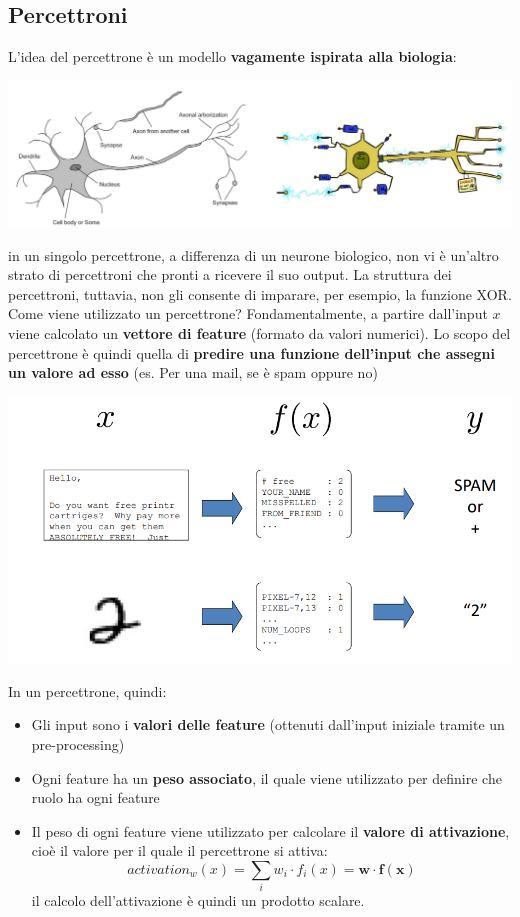 \documentclass[12pt]{article}
\begin{document}
\subsection{Percettroni}
L'idea del percettrone è un modello \textbf{vagamente ispirata alla biologia}:
\begin{center}
    \includegraphics[width =0.80\linewidth]{Images/85.PNG}
\end{center}
in un singolo percettrone, a differenza di un neurone biologico, non vi è un'altro strato di percettroni che
pronti a ricevere il suo output. La struttura dei percettroni, tuttavia, non gli consente di imparare, per esempio,
la funzione XOR. Come viene utilizzato un percettrone? Fondamentalmente, a partire dall'input $x$ viene calcolato un
\textbf{vettore di feature} (formato da valori numerici). Lo scopo del percettrone è quindi quella di \textbf{predire una funzione dell'input che assegni un valore ad esso}
(es. Per una mail, se è spam oppure no)
\begin{center}
    \includegraphics[width =0.80\linewidth]{Images/86.PNG}
\end{center}
In un percettrone, quindi:
\begin{itemize}
    \item Gli input sono i \textbf{valori delle feature} (ottenuti dall'input iniziale tramite un pre-processing)
    \item Ogni feature ha un \textbf{peso associato}, il quale viene utilizzato per definire che ruolo ha ogni feature
    \item Il peso di ogni feature viene utilizzato per calcolare il \textbf{valore di attivazione}, cioè il valore per il quale il percettrone si attiva:
    $$activation_w(x) = \sum_{i} w_i \cdot f_i(x) = \boldsymbol{w} \cdot \boldsymbol{f(x)}$$
    il calcolo dell'attivazione è quindi un prodotto scalare.
\end{itemize}
\end{document}
